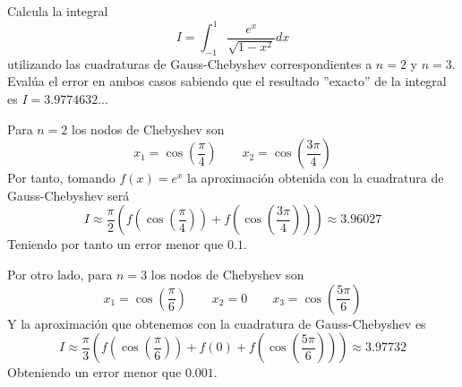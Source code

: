 \begin{ejer}
Calcula la integral
$$I=\int_{-1}^1\dfrac{e^x}{\sqrt{1-x^2}}dx$$
utilizando las cuadraturas de Gauss-Chebyshev correspondientes a $n=2$ y $n=3$. Evalúa el error en ambos casos sabiendo que el resultado ''exacto'' de la integral es $I=3.9774632...$
\end{ejer}
\begin{sol}
Para $n=2$ los nodos de Chebyshev son
$$x_1=\cos\left(\dfrac{\pi}{4}\right)\qquad x_2=\cos\left(\dfrac{3\pi}{4}\right)$$
Por tanto, tomando $f(x)=e^x$ la aproximación obtenida con la cuadratura de Gauss-Chebyshev será
$$I\approx \dfrac{\pi}{2}\left(f\left(\cos\left(\dfrac{\pi}{4}\right)\right)+f\left(\cos\left(\dfrac{3\pi}{4}\right)\right)\right)\approx 3.96027$$
Teniendo por tanto un error menor que $0.1$.

Por otro lado, para $n=3$ los nodos de Chebyshev son
$$x_1=\cos\left(\dfrac{\pi}{6}\right)\qquad x_2=0 \qquad x_3=\cos\left(\dfrac{5\pi}{6}\right)$$
Y la aproximación que obtenemos con la cuadratura de Gauss-Chebyshev es
$$I\approx \dfrac{\pi}{3}\left(f\left(\cos\left(\dfrac{\pi}{6}\right)\right)+f(0)+f\left(\cos\left(\dfrac{5\pi}{6}\right)\right)\right)\approx 3.97732$$
Obteniendo un error menor que $0.001$.
\end{sol}





























































